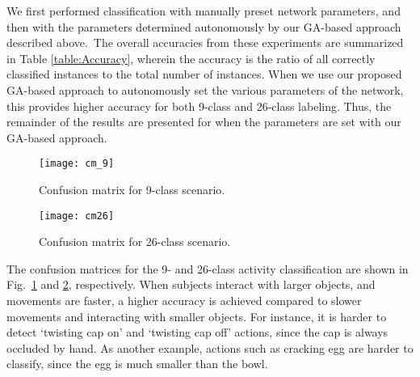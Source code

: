 \documentclass[10pt,twocolumn,letterpaper]{article}
\begin{document}
We first performed classification with manually preset network parameters, and then with the parameters determined autonomously by our GA-based approach described above.~The overall accuracies from these experiments are summarized in Table \ref{table:Accuracy}, wherein the accuracy is the ratio of all correctly classified instances to the total number of instances. When we use our proposed GA-based approach to autonomously set the various parameters of the network, this provides higher accuracy for both 9-class and 26-class labeling. Thus, the remainder of the results are presented for when the parameters are set with our GA-based approach.
\begin{table}[hb!]
\vspace{-0.25cm}
\centering
\caption{Overall accuracies for the 9- and 26-class labeling with and without using the proposed GA-based parameter setting}
\label{table:Accuracy}
\vspace{-0.3cm}
\end{table}

\begin{figure}[hbt!]
\vspace{-0.1cm}
\centering
\texttt{[image: cm\_9]}
\vspace{-0.1cm}
\caption{{\small{Confusion matrix for 9-class scenario.}}}
\label{fig:CM9}
\vspace{-0.25cm}
\end{figure}

\begin{figure}[hbt!]
\vspace{-0.1cm}
\centering
\texttt{[image: cm26]}
\vspace{-0.2cm}
\caption{{\small{Confusion matrix for 26-class scenario.}}}
\label{fig:CM26}
\vspace{-0.55cm}
\end{figure}

The confusion matrices for the 9- and 26-class activity classification are shown in Fig.~\ref{fig:CM9} and \ref{fig:CM26}, respectively. When subjects interact with larger objects, and movements are faster, a higher accuracy is achieved compared to slower movements and interacting with smaller objects. For instance, it is harder to detect `twisting cap on' and `twisting cap off' actions, since the cap is always occluded by hand. As another example, actions such as cracking egg are harder to classify, since the egg is much smaller than the bowl.
\end{document}

